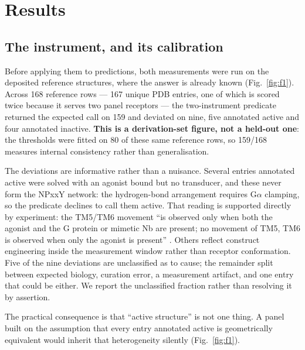 
\section*{Results}

\subsection*{The instrument, and its calibration}

Before applying them to predictions, both measurements were run on the deposited
reference structures, where the answer is already known
(Fig.~\ref{fig:f1}). Across 168 reference
rows --- 167 unique PDB entries, one of which is scored twice because it serves
two panel receptors --- the two-instrument predicate returned the expected call
on 159 and deviated on nine, five annotated active and four annotated inactive.
\textbf{This is a derivation-set figure, not a held-out one}: the thresholds
were fitted on 80 of these same reference rows, so 159/168 measures internal
consistency rather than generalisation.

The deviations are informative rather than a nuisance. Several entries annotated
active were solved with an agonist bound but no transducer, and these never form
the NPxxY network: the hydrogen-bond arrangement requires G$\alpha$ clamping, so
the predicate declines to call them active. That reading is supported
directly by experiment: the TM5/TM6 movement ``is observed only when both the
agonist and the G protein or mimetic Nb are present; no movement of TM5, TM6 is
observed when only the agonist is present'' \citep[p.~3711]{georgiou2025heterogeneity}.
Others reflect construct
engineering inside the measurement window rather than receptor conformation.
Five of the nine deviations are unclassified as to cause; the remainder split
between expected biology, curation error, a measurement artifact, and one entry
that could be either. We report the unclassified fraction rather than resolving
it by assertion.

The practical consequence is that ``active structure'' is not one thing. A panel
built on the assumption that every entry annotated active is geometrically
equivalent would inherit that heterogeneity silently (Fig.~\ref{fig:f1}).

